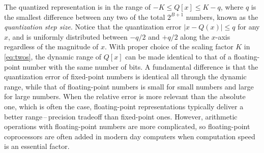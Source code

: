 \documentclass{article}
\begin{document}
The quantized representation is in the range of $-K \leq Q[x] \leq K -q$, where $q$ is the smallest difference between any two of the total $2^{B+1}$ numbers, known as the  \textit{quantization step size}.
Notice that the quantization error $|x - Q(x)| \leq q$ for any $x$, and is uniformly distributed between $- q/2$ and $+q/2$ along the $x$-axis regardless of the magnitude of $x$.
%
With proper choice of the scaling factor $K$ in \eqref{eq:twos}, the dynamic range of $Q[x]$ can be made identical to that of a floating-point number with the same number of bits.
A fundamental difference is that the quantization error of fixed-point numbers is identical all through the dynamic range, while that of floating-point numbers is small for small numbers and large for large numbers.
When the relative error is more relevant than the absolute one, which is often the case, floating-point representations typically deliver a better range\,--\,precision tradeoff than fixed-point ones.
However, arithmetic operations with floating-point numbers are more complicated, so floating-point coprocessors are often added in modern day computers when computation speed is an essential factor.
\end{document}
